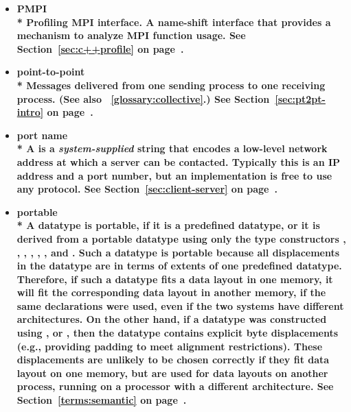 \begin{itemize}
\label{glossary:PMPI}
\item \bf{ PMPI} \\*
Profiling MPI interface. A name-shift interface that provides a mechanism to analyze MPI function usage.
See Section~\ref{sec:c++profile} on page~\pageref{sec:c++profile}.

\label{glossary:point-to-point}
\item \bf{ point-to-point} \\*
Messages delivered from one sending process to one receiving process. (See also ~\ref{glossary:collective}.)
See Section~\ref{sec:pt2pt-intro} on page~\pageref{sec:pt2pt-intro}.

\label{glossary:port_name}
\item \bf{ port name} \\*
A  is a {\em system-supplied} string that encodes a
low-level network address at which a server can be
contacted. Typically this is an IP address and a port number, but an
implementation is free to use any protocol.
See Section~\ref{sec:client-server} on page~\pageref{sec:client-server}.

\label{glossary:portable}
\item \bf{ portable} \\*
A datatype is portable, if it is a predefined datatype, or it is derived
from a portable datatype using only the type constructors
, ,
,
,
, , and
.
Such a datatype is portable because all displacements in the datatype
are in terms of extents of one predefined datatype.  Therefore, if such a
datatype fits a data layout in one memory, it will fit the
corresponding data layout in another memory, if the same declarations
were used, even if the two systems have different architectures.  On
the other hand, if a datatype was constructed using
,  or
, then the datatype contains explicit byte
displacements (e.g., providing padding to meet alignment restrictions).
These displacements are unlikely to be chosen correctly if they fit
data layout on one memory, but are used for data layouts on another
process, running on a processor with a different architecture.
See Section~\ref{terms:semantic} on page~\pageref{terms:semantic}.


\end{itemize}
